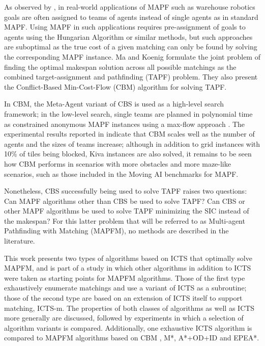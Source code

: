 \documentclass[english]{article}
\begin{document}
	As observed by \cite{ma2016b}, in real-world applications of MAPF such as warehouse robotics \cite{wurman2007} goals are often assigned to teams of agents instead of single agents as in standard MAPF. Using MAPF in such applications requires pre-assignment of goals to agents using the Hungarian Algorithm \cite{kuhn55} or similar methods, but such approaches are suboptimal as the true cost of a given matching can only be found by solving the corresponding MAPF instance. Ma and Koenig \cite{ma2016} formulate the joint problem of finding the optimal makespan solution across all possible matchings as the combined target-assignment and pathfinding (TAPF) problem. They also present the Conflict-Based Min-Cost-Flow (CBM) algorithm for solving TAPF. 
	
	In CBM, the Meta-Agent variant of CBS \cite{sharon2015} is used as a high-level search framework; in the low-level search, single teams are planned in polynomial time as constrained anonymous MAPF instances using a max-flow approach \cite{yu2013}. The experimental results reported in \cite{ma2016} indicate that CBM scales well as the number of agents and the sizes of teams increase; although in addition to grid instances with 10\% of tiles being blocked, Kiva \cite{wurman2007} instances are also solved, it remains to be seen how CBM performs in scenarios with more obstacles and more maze-like scenarios, such as those included in the Moving AI benchmarks \cite{sturtevant2012} for MAPF.
	
	Nonetheless, CBS successfully being used to solve TAPF raises two questions: Can MAPF algorithms other than CBS be used to solve TAPF? Can CBS or other MAPF algorithms be used to solve TAPF minimizing the SIC instead of the makespan? For this latter problem that will be referred to as Multi-agent Pathfinding with Matching (MAPFM), no methods are described in the literature. 
	
	This work presents two types of algorithms based on ICTS \cite{sharon2011} that optimally solve MAPFM, and is part of a study in which other algorithms in addition to ICTS were taken as starting points for MAPFM algorithms. Those of the first type exhaustively enumerate matchings and use a variant of ICTS as a subroutine; those of the second type are based on an extension of ICTS itself to support matching, ICTS-m. The properties of both classes of algorithms as well as ICTS more generally are discussed, followed by experiments in which a selection of algorithm variants is compared. Additionally, one exhaustive ICTS algorithm is compared to MAPFM algorithms based on CBM \cite{ma2016}, M*\cite{wagner2011}, A*+OD+ID\cite{standley2010} and EPEA*\cite{goldenberg2014}. 
	
\end{document}
